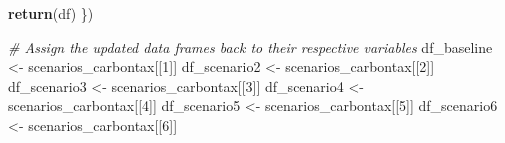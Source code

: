 \documentclass[
]{article}
\newenvironment{Shaded}{\begin{snugshade}}{\end{snugshade}}
\newcommand{\CommentTok}[1]{\textcolor[rgb]{0.56,0.35,0.01}{\textit{#1}}}
\newcommand{\DecValTok}[1]{\textcolor[rgb]{0.00,0.00,0.81}{#1}}
\newcommand{\FunctionTok}[1]{\textcolor[rgb]{0.13,0.29,0.53}{\textbf{#1}}}
\newcommand{\NormalTok}[1]{#1}
\newcommand{\OtherTok}[1]{\textcolor[rgb]{0.56,0.35,0.01}{#1}}
\begin{document}
\begin{Shaded}
\begin{Highlighting}[]
  \FunctionTok{return}\NormalTok{(df)}
\NormalTok{\})}

\CommentTok{\# Assign the updated data frames back to their respective variables}
\NormalTok{df\_baseline }\OtherTok{\textless{}{-}}\NormalTok{ scenarios\_carbontax[[}\DecValTok{1}\NormalTok{]]}
\NormalTok{df\_scenario2 }\OtherTok{\textless{}{-}}\NormalTok{ scenarios\_carbontax[[}\DecValTok{2}\NormalTok{]]}
\NormalTok{df\_scenario3 }\OtherTok{\textless{}{-}}\NormalTok{ scenarios\_carbontax[[}\DecValTok{3}\NormalTok{]]}
\NormalTok{df\_scenario4 }\OtherTok{\textless{}{-}}\NormalTok{ scenarios\_carbontax[[}\DecValTok{4}\NormalTok{]]}
\NormalTok{df\_scenario5 }\OtherTok{\textless{}{-}}\NormalTok{ scenarios\_carbontax[[}\DecValTok{5}\NormalTok{]]}
\NormalTok{df\_scenario6 }\OtherTok{\textless{}{-}}\NormalTok{ scenarios\_carbontax[[}\DecValTok{6}\NormalTok{]]}



\end{Highlighting}
\end{Shaded}
\end{document}
